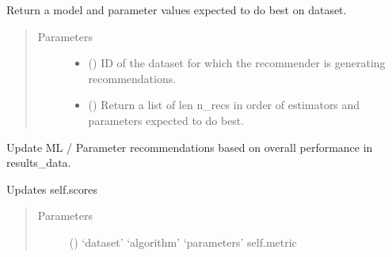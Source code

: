 \documentclass[letterpaper,10pt,english]{sphinxmanual}
\begin{document}
\begin{fulllineitems}
\begin{fulllineitems}
\label{\detokenize{index:ai.recommender.random_recommender.RandomRecommender.recommend}}
Return a model and parameter values expected to do best on dataset.
\begin{quote}\begin{description}
\item[{Parameters}] \leavevmode\begin{itemize}
\item {} 
 () \textendash{} ID of the dataset for which the recommender is generating recommendations.

\item {} 
 (\sphinxstyleliteralemphasis{\sphinxupquote{ (}}\sphinxstyleliteralemphasis{\sphinxupquote{)}}\sphinxstyleliteralemphasis{\sphinxupquote{, }}) \textendash{} Return a list of len n\_recs in order of estimators and parameters expected to do best.

\end{itemize}

\end{description}\end{quote}

\end{fulllineitems}


\begin{fulllineitems}
\label{\detokenize{index:ai.recommender.random_recommender.RandomRecommender.update}}
Update ML / Parameter recommendations based on overall performance in results\_data.

Updates self.scores
\begin{quote}\begin{description}
\item[{Parameters}] \leavevmode
{} () \textendash{} ‘dataset’
‘algorithm’
‘parameters’
self.metric

\end{description}\end{quote}

\end{fulllineitems}


\end{fulllineitems}
\end{document}
